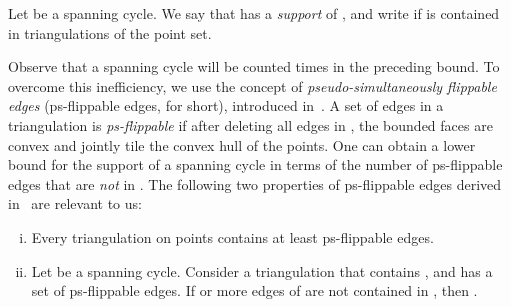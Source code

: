 \documentclass[11pt]{article}
\begin{document}
Let  be a spanning cycle. We say that   has a \emph{support} of
, and write  if  is contained in  triangulations
of the point set.

Observe that a spanning cycle  will be counted  times in
the preceding bound.
To overcome this inefficiency, we use the concept of \emph{pseudo-simultaneously
flippable edges} (ps-flippable edges, for short), introduced in~\cite{HSSTW11}.
A set  of edges in a triangulation is \emph{ps-flippable} if after
deleting all edges in , the bounded faces are convex and jointly
tile the convex hull of the points.
One can obtain a lower bound for the support of a spanning cycle 
in terms of the number of ps-flippable edges that are {\em not} in .
The following two properties of ps-flippable edges derived
in~\cite{HSSTW11} are relevant to us:
\begin{enumerate}[(i)]
\item Every triangulation on  points contains at least
   ps-flippable edges. \label{pro:lower}
\item Let  be a spanning cycle. Consider a triangulation  that contains , and
       has a set  of ps-flippable edges. If  or more edges of
        are not contained in , then .
\end{enumerate}
\end{document}
